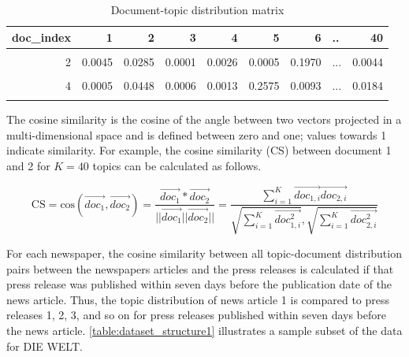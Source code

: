 \documentclass[
  12pt,
]{article}
\begin{document}
\begin{table}[H]

\caption{\label{tab:Document-topic distribution matrix - sample values}Document-topic distribution matrix \label{table:document_topic_distribution}}
\centering
\fontsize{7}{9}\selectfont
\begin{tabular}[t]{rrrrrrrlr}
\toprule
doc\_index & 1 & 2 & 3 & 4 & 5 & 6 & .. & 40\\
\midrule
\cellcolor{gray!6}{1} & \cellcolor{gray!6}{0.0006} & \cellcolor{gray!6}{0.0461} & \cellcolor{gray!6}{0.0008} & \cellcolor{gray!6}{0.0015} & \cellcolor{gray!6}{0.2259} & \cellcolor{gray!6}{0.0118} & \cellcolor{gray!6}{...} & \cellcolor{gray!6}{0.0195}\\
2 & 0.0045 & 0.0285 & 0.0001 & 0.0026 & 0.0005 & 0.1970 & ... & 0.0044\\
\cellcolor{gray!6}{3} & \cellcolor{gray!6}{0.0044} & \cellcolor{gray!6}{0.0040} & \cellcolor{gray!6}{0.0017} & \cellcolor{gray!6}{0.0006} & \cellcolor{gray!6}{0.0046} & \cellcolor{gray!6}{0.0191} & \cellcolor{gray!6}{...} & \cellcolor{gray!6}{0.0894}\\
4 & 0.0005 & 0.0448 & 0.0006 & 0.0013 & 0.2575 & 0.0093 & ... & 0.0184\\
\cellcolor{gray!6}{5} & \cellcolor{gray!6}{0.0003} & \cellcolor{gray!6}{0.0534} & \cellcolor{gray!6}{0.0004} & \cellcolor{gray!6}{0.0012} & \cellcolor{gray!6}{0.2859} & \cellcolor{gray!6}{0.0099} & \cellcolor{gray!6}{...} & \cellcolor{gray!6}{0.0142}\\
\bottomrule
\end{tabular}
\end{table}

The cosine similarity is the cosine of the angle between two vectors
projected in a multi-dimensional space and is defined between zero and
one; values towards 1 indicate similarity. For example, the cosine
similarity (CS) between document 1 and 2 for \(K=40\) topics can be
calculated as follows.

\[
\text{CS} = \text{cos}(\vec{doc_1},\vec{doc_2})=\frac{\vec{doc_1}*\vec{doc_2}}{||\vec{doc_1}||\vec{doc_2}||}=\frac{\sum^K_{i=1} \vec{doc_{1,i}}\vec{doc_{2,i}}}{\sqrt{\sum^K_{i=1} \vec{doc^2_{1,i}}}, \sqrt{\sum^K_{i=1}\vec{doc^2_{2,i}}}}
\]

For each newspaper, the cosine similarity between all topic-document
distribution pairs between the newspapers articles and the press
releases is calculated if that press release was published within seven
days before the publication date of the news article. Thus, the topic
distribution of news article 1 is compared to press releases 1, 2, 3,
and so on for press releases published within seven days before the news
article. \autoref{table:dataset_structure1} illustrates a sample subset
of the data for DIE WELT.
\end{document}

